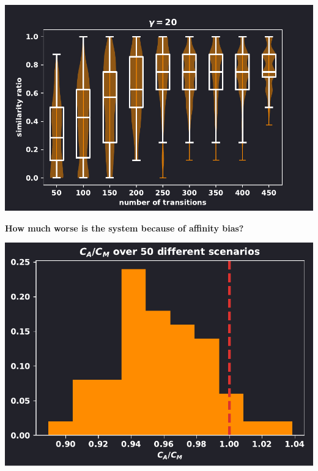 \documentclass{beamer}
\begin{document}
\begin{frame}
    \centering
        
\end{frame}

\begin{frame}[fragile]
    \begin{center}
    \includegraphics[width=.7\textwidth]{static/high_similarity_ratio.pdf}
    \end{center}
\end{frame}

\begin{frame}[fragile]
    \begin{minipage}{.49\textwidth}
    
    \end{minipage}
    \begin{minipage}{.49\textwidth}
        \vspace{-.1cm} 
    \end{minipage}
\end{frame}

\begin{frame}
    \begin{center}
    \Large \textbf{How much worse is the system because of affinity bias?}
    \end{center}
\end{frame}

\begin{frame}[fragile]
    \begin{center}
        \includegraphics[width=.7\textwidth]{static/ratio_one_to_twenty.pdf}
    \end{center}
\end{frame}
\end{document}
